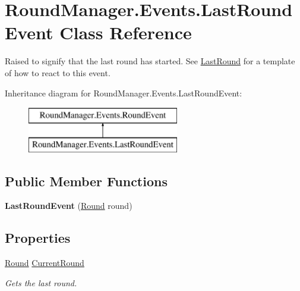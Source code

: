 \hypertarget{class_round_manager_1_1_events_1_1_last_round_event}{}\section{Round\+Manager.\+Events.\+Last\+Round\+Event Class Reference}
\label{class_round_manager_1_1_events_1_1_last_round_event}


Raised to signify that the last round has started. See \hyperlink{class_round_manager_1_1_last_round}{Last\+Round} for a template of how to react to this event.  


Inheritance diagram for Round\+Manager.\+Events.\+Last\+Round\+Event\+:\begin{figure}[H]
\begin{center}
\leavevmode
\includegraphics[height=2.000000cm]{class_round_manager_1_1_events_1_1_last_round_event}
\end{center}
\end{figure}
\subsection*{Public Member Functions}
\begin{DoxyCompactItemize}
\item 
\hypertarget{class_round_manager_1_1_events_1_1_last_round_event_ac9a848429ac84979f46fee54002cb197}{}{\bfseries Last\+Round\+Event} (\hyperlink{class_round_manager_1_1_round}{Round} round)\label{class_round_manager_1_1_events_1_1_last_round_event_ac9a848429ac84979f46fee54002cb197}

\end{DoxyCompactItemize}
\subsection*{Properties}
\begin{DoxyCompactItemize}
\item 
\hyperlink{class_round_manager_1_1_round}{Round} \hyperlink{class_round_manager_1_1_events_1_1_last_round_event_a0fbaecd15348421bdfd20f50e1d5a9f1}{Current\+Round}
\begin{DoxyCompactList}\small\item\em Gets the last round. \end{DoxyCompactList}\end{DoxyCompactItemize}


